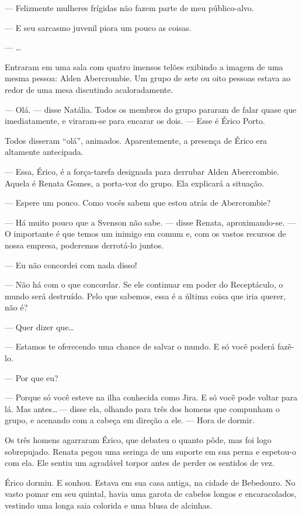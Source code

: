 --- Felizmente mulheres frígidas não fazem parte de meu público-alvo.

--- E seu sarcasmo juvenil piora um pouco as coisas.

--- \ldots

Entraram em uma sala com quatro imensos telões exibindo a imagem de uma mesma
pessoa: Alden Abercrombie. Um grupo de sete ou oito pessoas estava ao redor de
uma mesa discutindo acaloradamente.

--- Olá. --- disse Natália. Todos os membros do grupo pararam de falar quase
que imediatamente, e viraram-se para encarar os dois. --- Esse é Érico Porto.

Todos    disseram “olá”, animados. Aparentemente, a presença de Érico era
altamente antecipada.

--- Essa, Érico, é a força-tarefa designada para derrubar Alden Abercrombie.
Aque\-la é Renata Gomes, a porta-voz do grupo. Ela explicará a situação.

--- Espere um pouco. Como vocês sabem que estou atrás de Abercrombie?

--- Há muito pouco que a Svenson não sabe. --- disse Renata, aproximando-se.
--- O importante é que temos um inimigo em comum e, com os vastos recursos de
nossa empresa, poderemos derrotá-lo juntos.

--- Eu não concordei com nada disso!

--- Não há com o que concordar. Se ele continuar em poder do Receptáculo, o
mundo será destruído. Pelo que sabemos, essa é a última coisa que iria querer,
não é?

--- Quer dizer que\ldots

--- Estamos te oferecendo uma chance de salvar o mundo. E só você poderá
fazê-lo.

--- Por que eu?

--- Porque só você esteve na ilha conhecida como Jira. E só você pode voltar
para lá. Mas antes\ldots\,--- disse ela, olhando para três dos homens que
compunham o grupo, e acenando com a cabeça em direção a ele. --- Hora de
dormir.

Os três homens agarraram Érico, que debateu o quanto pôde, mas foi logo
sobrepujado. Renata pegou uma seringa de um suporte em sua perna e espetou-o
com ela. Ele sentiu um agradável torpor antes de perder os sentidos de vez.

\espaco

Érico dormiu. E sonhou. Estava em sua casa antiga, na cidade de Bebedouro. No
vasto pomar em seu quintal, havia uma garota de cabelos longos e encaracolados,
vestindo uma longa saia colorida e uma blusa de alcinhas.

